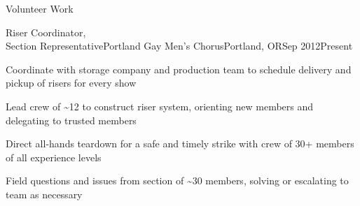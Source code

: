 \documentclass[letterpaper,12pt]{article}
\begin{document}
\begin{paracol}{2}
\begin{rsection}{Volunteer Work}
  \begin{rexperienceitem}{Riser Coordinator,\\Section Representative}{Portland Gay Men's Chorus}{Portland, OR}{Sep 2012}{Present}
    \item Coordinate with storage company and production team to schedule delivery and pickup of risers for every show
    \item Lead crew of \textasciitilde12 to construct riser system, orienting new members and delegating to trusted members
    \item Direct all-hands teardown for a safe and timely strike with crew of 30+ members of all experience levels
    \item Field questions and issues from section of \textasciitilde30 members, solving or escalating to team as necessary
  \end{rexperienceitem}
\end{rsection}

\flushpage
\end{paracol}
\end{document}
